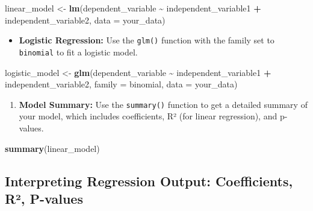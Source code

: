 \documentclass[
]{book}
\newenvironment{Shaded}{\begin{snugshade}}{\end{snugshade}}
\newcommand{\AttributeTok}[1]{\textcolor[rgb]{0.13,0.29,0.53}{#1}}
\newcommand{\FunctionTok}[1]{\textcolor[rgb]{0.13,0.29,0.53}{\textbf{#1}}}
\newcommand{\NormalTok}[1]{#1}
\newcommand{\OtherTok}[1]{\textcolor[rgb]{0.56,0.35,0.01}{#1}}
\newcommand{\SpecialCharTok}[1]{\textcolor[rgb]{0.81,0.36,0.00}{\textbf{#1}}}
\providecommand{\tightlist}{%
  \setlength{\itemsep}{0pt}\setlength{\parskip}{0pt}}
\begin{document}
\begin{Shaded}
\begin{Highlighting}[]
\NormalTok{   linear\_model }\OtherTok{\textless{}{-}} \FunctionTok{lm}\NormalTok{(dependent\_variable }\SpecialCharTok{\textasciitilde{}}\NormalTok{ independent\_variable1 }\SpecialCharTok{+}\NormalTok{ independent\_variable2, }\AttributeTok{data =}\NormalTok{ your\_data)}
\end{Highlighting}
\end{Shaded}

\begin{itemize}
\tightlist
\item
  \textbf{Logistic Regression:} Use the \texttt{glm()} function with the family set to \texttt{binomial} to fit a logistic model.
\end{itemize}

\begin{Shaded}
\begin{Highlighting}[]
\NormalTok{   logistic\_model }\OtherTok{\textless{}{-}} \FunctionTok{glm}\NormalTok{(dependent\_variable }\SpecialCharTok{\textasciitilde{}}\NormalTok{ independent\_variable1 }\SpecialCharTok{+}\NormalTok{ independent\_variable2, }\AttributeTok{family =}\NormalTok{ binomial, }\AttributeTok{data =}\NormalTok{ your\_data)}
\end{Highlighting}
\end{Shaded}

\begin{enumerate}
\def\labelenumi{\arabic{enumi}.}
\setcounter{enumi}{3}
\tightlist
\item
  \textbf{Model Summary:} Use the \texttt{summary()} function to get a detailed summary of your model, which includes coefficients, R² (for linear regression), and p-values.
\end{enumerate}

\begin{Shaded}
\begin{Highlighting}[]
   \FunctionTok{summary}\NormalTok{(linear\_model)}
\end{Highlighting}
\end{Shaded}

\hypertarget{interpreting-regression-output-coefficients-ruxb2-p-values}{%
\subsection*{Interpreting Regression Output: Coefficients, R², P-values}\label{interpreting-regression-output-coefficients-ruxb2-p-values}}
\end{document}
